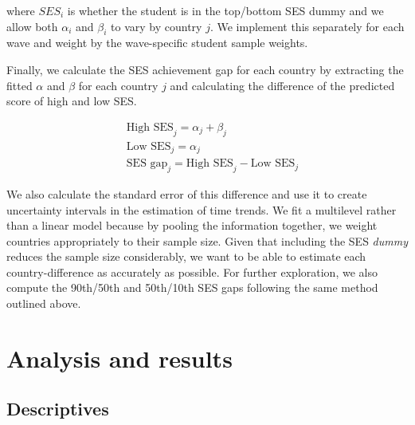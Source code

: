 \documentclass[11pt, a4paper]{article}\usepackage[]{graphicx}\usepackage[]{color}
\begin{document}
where \(SES_i\) is whether the student is in the top/bottom SES dummy and we allow both \(\alpha_i\) and \(\beta_i\) to vary by country \(j\). We implement this separately for each wave and weight by the wave-specific student sample weights.

Finally, we calculate the SES achievement gap for each country by extracting the fitted \(\alpha\) and \(\beta\) for each country \(j\) and calculating the difference of the predicted score of high and low SES.

\begin{equation}
\begin{split}
\quad \text{High SES}_j = \alpha_j + \beta_j \\
\quad \text{Low SES}_j = \alpha_j \\
\quad \text{SES gap}_j = \text{High SES}_j - \text{Low SES}_j
\end{split}
\end{equation}

We also calculate the standard error of this difference and use it to create uncertainty intervals in the estimation of time trends. We fit a multilevel rather than a linear model because by pooling the information together, we weight countries appropriately to their sample size. Given that including the SES \emph{dummy} reduces the sample size considerably, we want to be able to estimate each country-difference as accurately as possible. For further exploration, we also compute the 90th/50th and 50th/10th SES gaps following the same method outlined above.

\section{Analysis and results}

\subsection{Descriptives}





\end{document}
